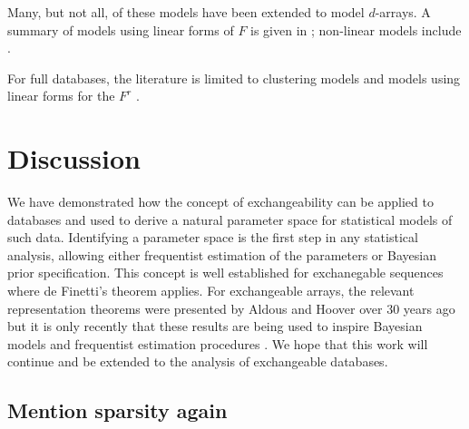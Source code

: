 Many, but not all, of these models have been extended to model $d$-arrays.
A summary of models using linear forms of $F$ is given in \cite{Kolda2009}; non-linear models include \cite{Xu2012}.

For full databases, the literature is limited to clustering models \cite{Kemp2006} and models using linear forms for the $F^r$ \citep[e.g.][]{Acar, Acar2012, Acar2013, Andersen2013, Davison, Ermis1958, Gallinari2011, Jimeng2009, Kong2010, Lippert2008, Networks, Nickel2011, Shangguan2012, Singh, Singha, Singh2008}.

\section{Discussion}

We have demonstrated how the concept of exchangeability can be applied to databases and used to derive a natural parameter space for statistical models of such data.
Identifying a parameter space is the first step in any statistical analysis, allowing either frequentist estimation of the parameters or Bayesian prior specification.
This concept is well established for exchanegable sequences where de Finetti's theorem \citep[e.g.][]{Kallenberg2005} applies.
For exchangeable arrays, the relevant representation theorems were presented by Aldous and Hoover \cite{Aldous1981a, Hoover1979} over 30 years ago but it is only recently that these results are being used to inspire Bayesian models \cite{Hoff2007a, Roy2009, Lloyd2012} and frequentist estimation procedures \cite{Kallenberg1999a,Choi2012, Wolfe2013}.
We hope that this work will continue and be extended to the analysis of exchangeable databases.

\subsection{Mention sparsity again}


\outbpdocument{


}
